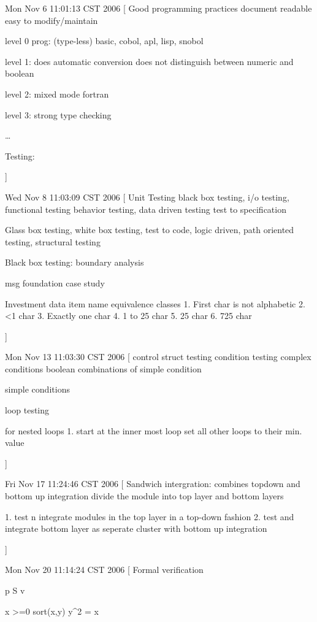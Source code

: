 \documentclass[a4paper]{article}
\begin{document}
{
Mon Nov  6 11:01:13 CST 2006
[
  Good programming practices
  	document
	readable
	easy to modify/maintain

	level 0 prog:  (type-less)
		basic, cobol, apl, lisp, snobol
	
	level 1:  does automatic conversion
		does not distinguish between numeric and boolean

	level 2: mixed mode   fortran

	level 3:   strong type checking

	\ldots

 Testing:

   

]

Wed Nov  8 11:03:09 CST 2006
[
Unit Testing
	black box testing, i/o testing, functional testing
			behavior testing, data driven testing
			test to specification
			
	Glass box testing, white box testing, test to code, logic driven, path oriented testing, structural testing

	Black box testing:
		boundary analysis

	msg foundation case study

	  Investment data
	  item name
	  equivalence classes
	  1. First char is not alphabetic
	  2. <1 char
	  3. Exactly one char
	  4. 1 to 25 char
	  5. 25 char
	  6. 725 char

]

Mon Nov 13 11:03:30 CST 2006
[
 control struct testing
 	condition testing
	complex conditions boolean combinations of simple condition

	simple conditions 

loop testing

	for nested loops
		1. start at the inner most loop
		   set all other loops to their min. value


]

Fri Nov 17 11:24:46 CST 2006
[
  Sandwich intergration:
  	combines topdown and bottom up integration
	divide the module into top layer and bottom layers

	1. test n integrate modules in the top layer in a  top-down fashion
	2. test and integrate bottom layer as seperate cluster with bottom up integration

]

Mon Nov 20 11:14:24 CST 2006
[
Formal verification

  {p}   S {v}

  {x >=0} sort(x,y)  {y^2 = x}

}
\end{document}
